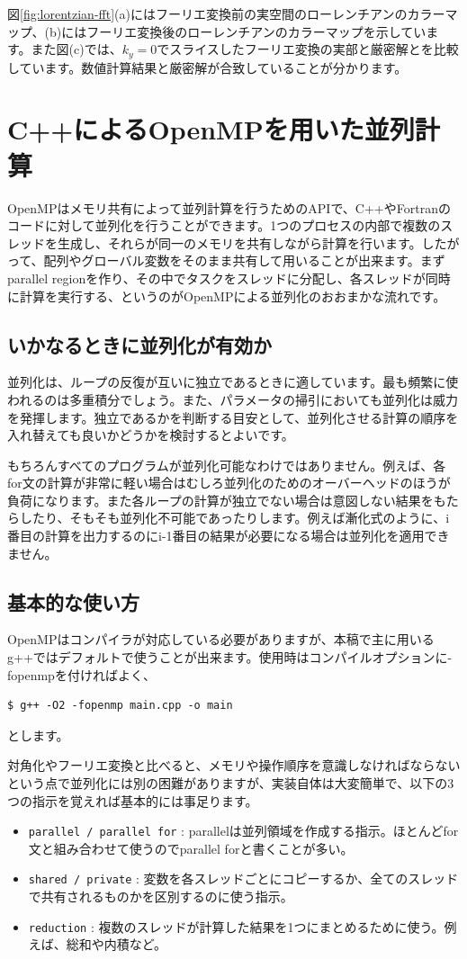 \documentclass[12pt]{jreport}
\begin{document}
図\ref{fig:lorentzian-fft}(a)にはフーリエ変換前の実空間のローレンチアンのカラーマップ、(b)にはフーリエ変換後のローレンチアンのカラーマップを示しています。また図(c)では、$k_y = 0$でスライスしたフーリエ変換の実部と厳密解とを比較しています。数値計算結果と厳密解が合致していることが分かります。

\section{C++によるOpenMPを用いた並列計算}
OpenMPはメモリ共有によって並列計算を行うためのAPIで、C++やFortranのコードに対して並列化を行うことができます。1つのプロセスの内部で複数のスレッドを生成し、それらが同一のメモリを共有しながら計算を行います。したがって、配列やグローバル変数をそのまま共有して用いることが出来ます。まずparallel regionを作り、その中でタスクをスレッドに分配し、各スレッドが同時に計算を実行する、というのがOpenMPによる並列化のおおまかな流れです。

\subsection{いかなるときに並列化が有効か}
並列化は、ループの反復が互いに独立であるときに適しています。最も頻繁に使われるのは多重積分でしょう。また、パラメータの掃引においても並列化は威力を発揮します。独立であるかを判断する目安として、並列化させる計算の順序を入れ替えても良いかどうかを検討するとよいです。

もちろんすべてのプログラムが並列化可能なわけではありません。例えば、各for文の計算が非常に軽い場合はむしろ並列化のためのオーバーヘッドのほうが負荷になります。また各ループの計算が独立でない場合は意図しない結果をもたらしたり、そもそも並列化不可能であったりします。例えば漸化式のように、i番目の計算を出力するのにi-1番目の結果が必要になる場合は並列化を適用できません。

\subsection{基本的な使い方}
OpenMPはコンパイラが対応している必要がありますが、本稿で主に用いるg++ではデフォルトで使うことが出来ます。使用時はコンパイルオプションに-fopenmpを付ければよく、
\begin{lstlisting}[style=terminal]
  $ g++ -O2 -fopenmp main.cpp -o main
\end{lstlisting}
とします。

対角化やフーリエ変換と比べると、メモリや操作順序を意識しなければならないという点で並列化には別の困難がありますが、実装自体は大変簡単で、以下の3つの指示を覚えれば基本的には事足ります。
\begin{itemize}
  \item \texttt{parallel / parallel for} : parallelは並列領域を作成する指示。ほとんどfor文と組み合わせて使うのでparallel forと書くことが多い。
  \item \texttt{shared / private} : 変数を各スレッドごとにコピーするか、全てのスレッドで共有されるものかを区別するのに使う指示。
  \item \texttt{reduction} : 複数のスレッドが計算した結果を1つにまとめるために使う。例えば、総和や内積など。
\end{itemize}
\end{document}
